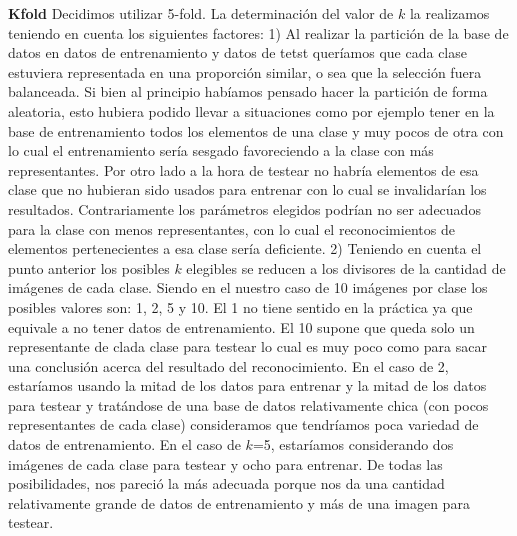 \textbf{Kfold}
Decidimos utilizar 5-fold.
La determinación del valor de $k$ la realizamos teniendo en cuenta los siguientes factores:
1) Al realizar la partición de la base de datos en datos de entrenamiento y datos de tetst queríamos que cada clase estuviera representada en una proporción similar, o sea que la selección fuera balanceada. Si bien al principio habíamos pensado hacer la partición de forma aleatoria, esto hubiera podido llevar a situaciones como por ejemplo tener en la base de entrenamiento todos los elementos de una clase y muy pocos de otra con lo cual el entrenamiento sería sesgado favoreciendo a la clase con más representantes. Por otro lado a la hora de testear no habría elementos de esa clase que no hubieran sido usados para entrenar con lo cual se invalidarían los resultados. Contrariamente los parámetros elegidos podrían no ser adecuados para la clase con menos representantes, con lo cual el reconocimientos de elementos pertenecientes a esa clase sería deficiente.
2) Teniendo en cuenta el punto anterior los posibles $k$ elegibles se reducen a los divisores de la cantidad de imágenes de cada clase. Siendo en el nuestro caso de 10 imágenes por clase los posibles valores son: 1, 2, 5 y 10. El 1 no tiene sentido en la práctica ya que equivale a no tener datos de entrenamiento. El 10 supone que queda solo un representante de clada clase para testear lo cual es muy poco como para sacar una conclusión acerca del resultado del reconocimiento. En el caso de 2, estaríamos usando la mitad de los datos para entrenar y la mitad de los datos para testear y tratándose de una base de datos relativamente chica (con pocos representantes de cada clase) consideramos que tendríamos poca variedad de datos de entrenamiento. En el caso de $k$=5, estaríamos considerando dos imágenes de cada clase para testear y ocho para entrenar. De todas las posibilidades, nos pareció la más adecuada porque nos da una cantidad relativamente grande de datos de entrenamiento y más de una imagen para testear. 

